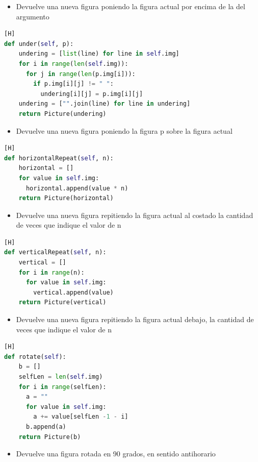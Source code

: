 \documentclass{article}
\begin{document}
	\begin{itemize}
		\item Devuelve una nueva figura poniendo la figura actual por encima de la del argumento
	\end{itemize}
	\begin{lstlisting}[language=Python,caption={Función under(self, p)}][H]
def under(self, p):
    undering = [list(line) for line in self.img]  
    for i in range(len(self.img)):
      for j in range(len(p.img[i])):
        if p.img[i][j] != " ":
          undering[i][j] = p.img[i][j]  
    undering = ["".join(line) for line in undering]  
    return Picture(undering)
	\end{lstlisting}
	\begin{itemize}
		\item Devuelve una nueva figura poniendo la figura p sobre la figura actual
	\end{itemize}
	\begin{lstlisting}[language=Python,caption={Función horizontalRepeat(self, n)}][H]
def horizontalRepeat(self, n):
    horizontal = []
    for value in self.img:
      horizontal.append(value * n)
    return Picture(horizontal)
	\end{lstlisting}
	\begin{itemize}
		\item Devuelve una nueva figura repitiendo la figura actual al costado la cantidad de veces que indique el valor de n
	\end{itemize}
	\begin{lstlisting}[language=Python,caption={verticalRepeat(self, n)}][H]
def verticalRepeat(self, n):
    vertical = []
    for i in range(n):
      for value in self.img:
        vertical.append(value)
    return Picture(vertical)
	\end{lstlisting}
	\begin{itemize}
		\item Devuelve una nueva figura repitiendo la figura actual debajo, la cantidad de veces que indique el valor de n
	\end{itemize}
	\begin{lstlisting}[language=Python,caption={rotate(self)}][H]
def rotate(self):
    b = []
    selfLen = len(self.img)
    for i in range(selfLen):
      a = ""
      for value in self.img:
        a += value[selfLen -1 - i]
      b.append(a)
    return Picture(b)
	\end{lstlisting}
	\begin{itemize}
		\item Devuelve una figura rotada en 90 grados, en sentido antihorario
	\end{itemize}
	
\end{document}
